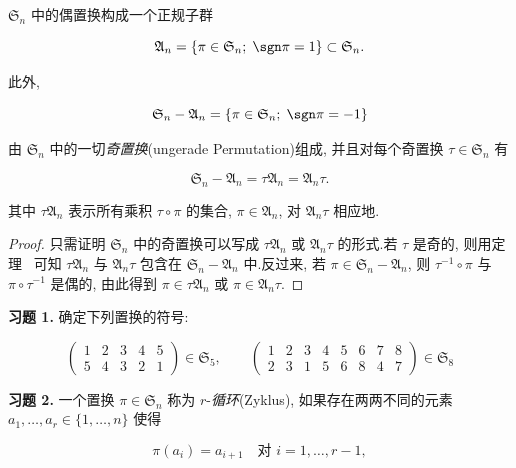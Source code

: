 \begin{remark}[交替群]\label{rem:4.1.9}
$\mathfrak{S}_n$ 中的偶置换构成一个正规子群

\[
\mathfrak{A}_n = \left\{\pi \in \mathfrak{S}_n;\; \sgn \pi = 1\right\} \subset \mathfrak{S}_n.
\]

此外,

\[
\mathfrak{S}_n - \mathfrak{A}_n = \left\{\pi \in \mathfrak{S}_n;\; \sgn \pi = -1\right\}
\]

由 $\mathfrak{S}_n$ 中的一切\emph{奇置换}(\textup{ungerade Permutation})组成, 并且对每个奇置换 $\tau \in \mathfrak{S}_n$ 有

\[
\mathfrak{S}_n - \mathfrak{A}_n = \tau \mathfrak{A}_n = \mathfrak{A}_n \tau.
\]

其中 $\tau \mathfrak{A}_n$ 表示所有乘积 $\tau \circ \pi$ 的集合, $\pi \in \mathfrak{A}_n$, 对 $\mathfrak{A}_n \tau$ 相应地.
\end{remark}

\begin{proof}
只需证明 $\mathfrak{S}_n$ 中的奇置换可以写成 $\tau \mathfrak{A}_n$ 或 $\mathfrak{A}_n \tau$ 的形式.若 $\tau$ 是奇的, 则用定理~ 可知 $\tau \mathfrak{A}_n$ 与 $\mathfrak{A}_n \tau$ 包含在 $\mathfrak{S}_n - \mathfrak{A}_n$ 中.反过来, 若 $\pi \in \mathfrak{S}_n - \mathfrak{A}_n$, 则 $\tau^{-1} \circ \pi$ 与 $\pi \circ \tau^{-1}$ 是偶的, 由此得到 $\pi \in \tau \mathfrak{A}_n$ 或 $\pi \in \mathfrak{A}_n \tau$.
\end{proof}

\aufgaben

\noindent\textbf{习题 1.} 确定下列置换的符号:

\[
\begin{pmatrix} 1 & 2 & 3 & 4 & 5 \\ 5 & 4 & 3 & 2 & 1 \end{pmatrix} \in \mathfrak{S}_5, \qquad \begin{pmatrix} 1 & 2 & 3 & 4 & 5 & 6 & 7 & 8 \\ 2 & 3 & 1 & 5 & 6 & 8 & 4 & 7 \end{pmatrix} \in \mathfrak{S}_8
\]

\medskip
\noindent\textbf{习题 2.} 一个置换 $\pi \in \mathfrak{S}_n$ 称为 $r$-\emph{循环}(\textup{Zyklus}), 如果存在两两不同的元素 $a_1, \ldots, a_r \in \{1, \ldots, n\}$ 使得

\[
\pi(a_i) = a_{i + 1} \quad \text{对 } i = 1, \ldots, r - 1,
\]

